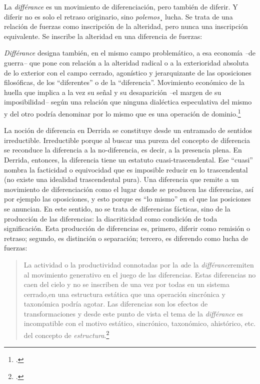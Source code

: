 La \emph{différance} es un movimiento de diferenciación, pero también de
diferir. Y diferir no es solo el retraso originario, sino
\emph{polemos}¸ lucha. Se trata de una relación de fuerzas como
inscripción de la alteridad, pero nunca una inscripción equivalente. Se
inscribe la alteridad en una diferencia de fuerzas:

\emph{Différance} designa también, en el mismo campo problemático, a esa
economía \emph{--}de guerra\emph{--} que pone con relación a la
alteridad radical o a la exterioridad absoluta de lo exterior con el
campo cerrado, agonístico y jerarquizante de las oposiciones
filosóficas, de los ``diferentes'' o de la ``diferencia''. Movimiento
económico de la huella que implica a la vez su señal y su desaparición
\emph{--}el margen de su imposibilidad\emph{--} según una relación que
ninguna dialéctica especulativa del mismo y del otro podría denominar
por lo mismo que es una operación de dominio.\footcite[9]{derrida1997}

La noción de diferencia en Derrida se constituye desde un entramado de
sentidos irreductible. Irreductible porque al buscar una pureza del
concepto de diferencia se reconduce la diferencia a la no-diferencia, es
decir, a la presencia plena. En Derrida, entonces, la diferencia tiene
un estatuto cuasi-trascendental. Ese \enquote{cuasi} nombra la facticidad o
equivocidad que es imposible reducir en lo trascendental (no existe una
idealidad trascendental pura). Una diferencia que remite a un movimiento
de diferenciación como el lugar donde se producen las diferencias, así
por ejemplo las oposiciones, y esto porque es \enquote{lo mismo} en el que las
posiciones se anuncian. En este sentido, no se trata de diferencias
fácticas, sino de la producción de las diferencias: la diacriticidad
como condición de toda significación. Esta producción de diferencias es,
primero, diferir como remisión o retraso; segundo, es distinción o
separación; tercero, es diferendo como lucha de fuerzas:

\begin{quote}
La actividad o la productividad connotadas por la \emph{a}de la
\emph{différance}remiten al movimiento generativo en el juego de las
diferencias. Estas diferencias no caen del cielo y no se inscriben de
una vez por todas en un sistema cerrado,en una estructura estática que
una operación sincrónica y taxonómica podría agotar. Las diferencias son
los efectos de transformaciones y desde este punto de vista el tema de
la \emph{différance} es incompatible con el motivo estático, sincrónico,
taxonómico, ahistórico, etc. del concepto de
\emph{estructura}.\footcite[37]{derrida1997}
\end{quote}

